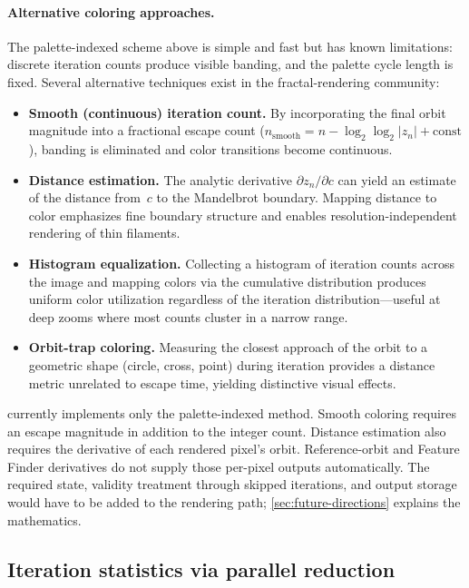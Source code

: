 \paragraph{Alternative coloring approaches.}
The palette-indexed scheme above is simple and fast but has known
limitations: discrete iteration counts produce visible banding, and
the palette cycle length is fixed.  Several alternative techniques
exist in the fractal-rendering community:
\begin{itemize}
  \item \textbf{Smooth (continuous) iteration count.}  By incorporating
    the final orbit magnitude into a fractional escape count
    ($n_{\text{smooth}} = n - \log_2\!\log_2|z_n| + \text{const}$),
    banding is eliminated and color transitions become continuous.
  \item \textbf{Distance estimation.}  The analytic derivative
    $\partial z_n/\partial c$ can yield an estimate of the distance from~$c$ to the
    Mandelbrot boundary.  Mapping distance to color emphasizes fine
    boundary structure and enables resolution-independent rendering of
    thin filaments.
  \item \textbf{Histogram equalization.}  Collecting a histogram of
    iteration counts across the image and mapping colors via the
    cumulative distribution produces uniform color utilization
    regardless of the iteration distribution---useful at deep zooms
    where most counts cluster in a narrow range.
  \item \textbf{Orbit-trap coloring.}  Measuring the closest approach
    of the orbit to a geometric shape (circle, cross, point) during
    iteration provides a distance metric unrelated to escape time,
    yielding distinctive visual effects.
\end{itemize}
\FractalShark{} currently implements only the palette-indexed method.
Smooth coloring requires an escape magnitude in addition to the integer count.
Distance estimation also requires the derivative of each rendered pixel's orbit.
Reference-orbit and Feature Finder derivatives do not supply those per-pixel
outputs automatically. The required state, validity treatment through skipped
iterations, and output storage would have to be added to the rendering path;
\cref{sec:future-directions} explains the mathematics.

\subsection{Iteration statistics via parallel reduction}
\label{subsec:reduction}

